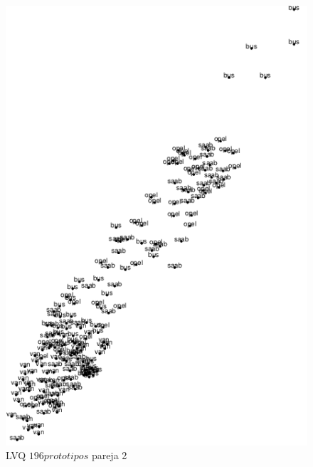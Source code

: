 \documentclass[11pt,spanish,listoffigures,listoftables]{workluis}
\begin{document}
\begin{figure}[H]
\centering
\includegraphics[scale=0.5]{lvq196p2}
\caption{LVQ $196 prototipos$ pareja 2}
\end{figure} 
\end{document}
